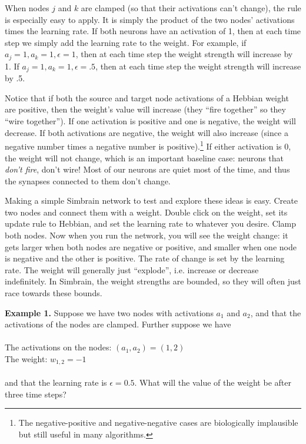 When nodes $j$ and $k$ are clamped (so that their activations can't change), the rule is especially easy to apply. It is simply the product of the two nodes' activations times the learning rate. If both neurons have an activation of 1, then at each time step we simply add the learning rate to the weight. For example, if $a_j = 1, a_k=1, \epsilon =1$, then at each time step the weight strength will increase by 1. If $a_j = 1, a_k=1, \epsilon= .5$, then at each time step the weight strength will increase by .5.

Notice that if both the source and target node activations of a Hebbian weight are positive, then the weight's value will increase (they ``fire together'' so they ``wire together''). If one activation is positive and one is negative, the weight will decrease. If both activations are negative, the weight will also increase (since a negative number times a negative number is positive).\footnote{The negative-positive and negative-negative cases are biologically implausible but still useful in many algorithms.}  If either activation is 0, the weight will not change, which is an important baseline case: neurons that \emph{don't fire}, don't wire! Most of our neurons are quiet most of the time, and thus the synapses connected to them don't change. 

Making a simple Simbrain network to test and explore these ideas is easy. Create two nodes and connect them with a weight. Double click on the weight, set its update rule to Hebbian, and set the learning rate to whatever you desire. Clamp both nodes. Now when you run the network, you will see the weight change: it gets larger when both nodes are negative or positive, and smaller when one node is negative and the other is positive. The rate of change is set by the learning rate. The weight will generally just ``explode'', i.e. increase or decrease indefinitely. In Simbrain, the weight strengths are bounded, so they will often just race towards these bounds. 


\bigskip

\noindent
{\bf Example 1.} Suppose we have two nodes with activations $a_1$ and $a_2$, and that the activations of the nodes are clamped. Further suppose we have \\ \\
\indent \qquad\qquad The activations on the nodes: $(a_1,a_2) = (1,2)$\\
\indent \qquad\qquad The weight: $w_{1,2} = -1$ \\ \\
and that the learning rate is $\epsilon =0.5$. What will the value of the  weight be after three time steps? 

